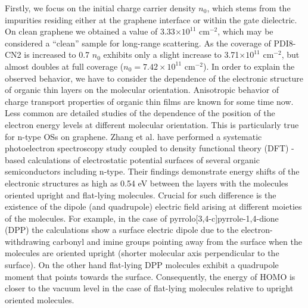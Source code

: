 \documentclass[preprint,aip,jap]{revtex4-2}
\begin{document}
Firstly, we focus on the initial charge carrier density $n_0$, which stems from the impurities residing either at the graphene interface or within the gate dielectric. On clean graphene we obtained a value of 3.33$\times 10^{11}$ cm$^{-2}$, which may be considered a ``clean'' sample for long-range scattering.  As the coverage of PDI8-CN2 is increased to 0.7 $n_0$ exhibits only a slight increase to 3.71$\times 10^{11}$ cm$^{-2}$, but almost doubles at full coverage ($n_{0}=7.42\times 10^{11}$ cm$^{-2}$).
In order to explain the observed behavior, we have to consider the dependence of the electronic structure of organic thin layers on the molecular orientation.  Anisotropic behavior of charge transport properties of organic thin films are known for some time now\cite{sundar-2004}. Less common are detailed studies of the dependence of the position of the electron energy levels at different molecular orientation. This is particularly true for n-type OSs on graphene. Zhang et al.\cite{zhang-2016d} have performed a systematic photoelectron spectroscopy study coupled to density functional theory (DFT) -based calculations of electrostatic potential surfaces of several organic semiconductors including n-type. Their findings demonstrate energy shifts of the electronic structures as high as 0.54 eV between the layers with the molecules oriented upright and flat-lying molecules.  Crucial for such difference is the existence of the dipole (and quadrupole) electric field arising at different moieties of the molecules. For example, in the case of pyrrolo[3,4-c]pyrrole-1,4-dione (DPP)  the calculations show a surface electric dipole due to the electron-withdrawing carbonyl and imine groups pointing  away from the surface when the molecules are oriented upright (shorter molecular axis perpendicular to the surface). On the other hand flat-lying DPP molecules exhibit a quadrupole moment that points towards the surface. Consequently, the energy of HOMO is closer to the vacuum level in the case of flat-lying molecules relative to upright oriented molecules.  
\end{document}
